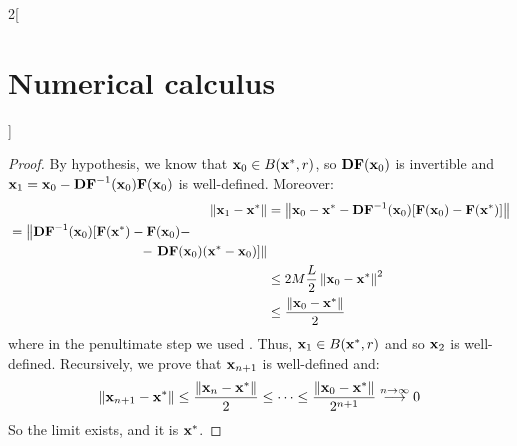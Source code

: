 \documentclass[../../../main_math.tex]{subfiles}
\begin{document}
\begin{multicols}{2}[\section{Numerical calculus}]
\begin{proof}
    By hypothesis, we know that $\boldsymbol{\mathrm{x}}_0\in B(\boldsymbol{\mathrm{x}}^*,r)$, so $\boldsymbol{\mathrm{DF}}(\boldsymbol{\mathrm{x}}_0)$ is invertible and $\boldsymbol{\mathrm{x}}_1=\boldsymbol{\mathrm{x}}_0-\boldsymbol{\mathrm{DF}}^{-1}(\boldsymbol{\mathrm{x}}_0)\boldsymbol{\mathrm{F}}(\boldsymbol{\mathrm{x}}_0)$ is well-defined. Moreover:
    \begin{align*}
      \norm{\vf{x}_1-\vf{x}^*} & = \norm{\vf{x}_0-\vf{x}^*-\vf{DF}^{-1}(\vf{x}_0)[\vf{F}(\vf{x}_0) - \vf{F}(\vf{x}^*)]} \\
      \begin{split}
        & =\left\|\vf{DF}^{-1}(\vf{x}_0)[\vf{F}(\vf{x}^*)-\vf{F}(\vf{x}_0)-\right.\\
            &\hspace{3.5cm}-\left.\vf{DF}(\vf{x}_0)(\vf{x}^*-\vf{x}_0)]\right\| \\
      \end{split}                           \\
                               & \leq 2M \frac{L}{2} \norm{\vf{x}_0-\vf{x}^*}^2                                         \\
                               & \leq \frac{\norm{\vf{x}_0-\vf{x}^*}}{2}
    \end{align*}
    where in the penultimate step we used . Thus, $\boldsymbol{\mathrm{x}}_1\in B(\boldsymbol{\mathrm{x}}^*,r)$ and so $\boldsymbol{\mathrm{x}}_2$ is well-defined. Recursively, we prove that $\boldsymbol{\mathrm{x}}_{n+1}$ is well-defined and:
    $$
      \left\|\boldsymbol{\mathrm{x}}_{n+1}-\boldsymbol{\mathrm{x}}^*\right\|\leq \frac{\left\|\boldsymbol{\mathrm{x}}_n-\boldsymbol{\mathrm{x}}^*\right\|}{2}\leq\cdots \leq \frac{\left\|\boldsymbol{\mathrm{x}}_0-\boldsymbol{\mathrm{x}}^*\right\|}{2^{n+1}}\overset{n\to\infty}{\longrightarrow}0
    $$
    So the limit exists, and it is $\boldsymbol{\mathrm{x}}^*$.
  \end{proof}

\end{multicols}
\end{document}
